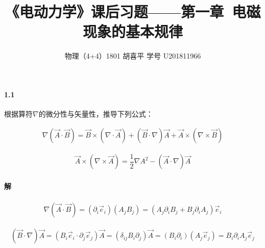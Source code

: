 \documentclass{article}
\author{物理（4+4）1801 \quad 胡喜平 \quad 学号 U201811966}
\affil{网站 https://hxp.plus/ \quad 邮件 hxp201406@gmail.com}
\title{《电动力学》课后习题——第一章\ 电磁现象的基本规律}
\begin{document}
\maketitle\thispagestyle{fancy}

\paragraph{1.1}

根据算符$\nabla$的微分性与矢量性，推导下列公式：

\begin{equation}
  \begin{aligned}
    \label{eq:q1}
    \nabla \left( \vec{A} \cdot \vec{B} \right) = \vec{B} \times \left( \nabla \cdot \vec{A} \right) + \left( \vec{B} \cdot \nabla \right) \vec{A} + \vec{A} \times \left( \nabla \times \vec{B}  \right) 
  \end{aligned}
\end{equation}

\begin{equation}
  \label{eq:q2}
  \begin{aligned}
    \vec{A} \times \left( \nabla \times \vec{A} \right) = \dfrac{1}{2} \nabla A^2 - \left( \vec{A} \cdot \nabla \right) \vec{A} 
  \end{aligned}
\end{equation}

\paragraph{解}

\begin{equation}
  \label{eq:1}
  \begin{aligned}
    \nabla \left( \vec{A} \cdot \vec{B} \right) = \left( \partial_i \vec{e}_i \right) \left( A_j B_j  \right) = \left( A_j \partial_i B_j + B_j \partial_i A_j \right) \vec{e}_i
  \end{aligned}
\end{equation}

\begin{equation}
  \label{eq:2}
  \begin{aligned}
    \left( \vec{B} \cdot \nabla \right) \vec{A} = \left( B_i \vec{e}_i \cdot \partial_j \vec{e}_j  \right) \vec{A} = \left( \delta_{ij} B_i \partial_j \right) \vec{A} = \left( B_i \partial_i  \right) \left( A_j \vec{e}_j \right) = B_i \partial_i A_j \vec{e}_j
  \end{aligned}
\end{equation}
\end{document}
